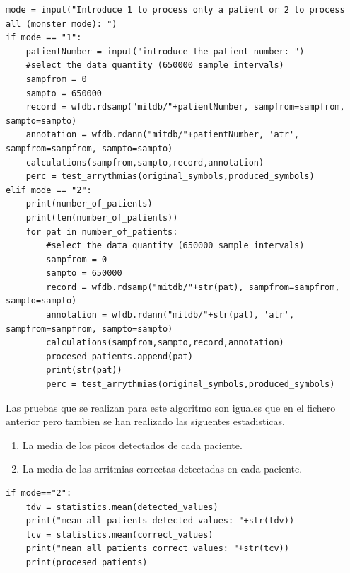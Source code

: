 \lstset{language=python, breaklines=true, basicstyle=\footnotesize}
\begin{lstlisting}[frame=single]
    mode = input("Introduce 1 to process only a patient or 2 to process all (monster mode): ")
if mode == "1":
    patientNumber = input("introduce the patient number: ")
    #select the data quantity (650000 sample intervals)
    sampfrom = 0
    sampto = 650000
    record = wfdb.rdsamp("mitdb/"+patientNumber, sampfrom=sampfrom, sampto=sampto)
    annotation = wfdb.rdann("mitdb/"+patientNumber, 'atr', sampfrom=sampfrom, sampto=sampto)
    calculations(sampfrom,sampto,record,annotation)
    perc = test_arrythmias(original_symbols,produced_symbols)
elif mode == "2":
    print(number_of_patients)
    print(len(number_of_patients))
    for pat in number_of_patients:
        #select the data quantity (650000 sample intervals)
        sampfrom = 0
        sampto = 650000
        record = wfdb.rdsamp("mitdb/"+str(pat), sampfrom=sampfrom, sampto=sampto)
        annotation = wfdb.rdann("mitdb/"+str(pat), 'atr', sampfrom=sampfrom, sampto=sampto)
        calculations(sampfrom,sampto,record,annotation)
        procesed_patients.append(pat)
        print(str(pat))
        perc = test_arrythmias(original_symbols,produced_symbols)
\end{lstlisting}

Las pruebas que se realizan para este algoritmo son iguales que en el fichero anterior pero tambien
se han realizado las siguentes estadisticas.

\begin{enumerate}
	\item La media de los picos detectados de cada paciente.
	\item La media de las arritmias correctas detectadas en cada paciente.
\end{enumerate} 

\lstset{language=python, breaklines=true, basicstyle=\footnotesize}
\begin{lstlisting}[frame=single]
if mode=="2":
    tdv = statistics.mean(detected_values)
    print("mean all patients detected values: "+str(tdv))
    tcv = statistics.mean(correct_values)
    print("mean all patients correct values: "+str(tcv))
    print(procesed_patients)
\end{lstlisting}

